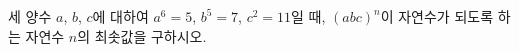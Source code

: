 세 양수 $a$, $b$, $c$에 대하여 $a^{6}=5$, $b^{5}=7$, $c^{2}=11$일 때, $(abc)^{n}$이 자연수가 되도록 하는 자연수 $n$의 최솟값을 구하시오.
